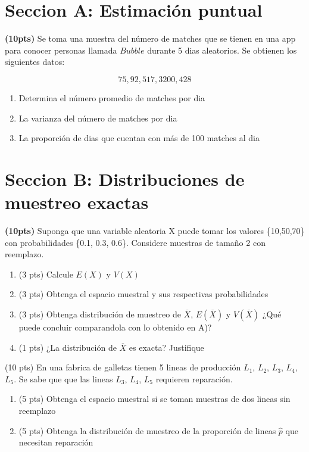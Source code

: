 \documentclass[addpoints]{exam}
\theoremstyle{mytheor}
\begin{document}
\begin{questions} 

\section*{Seccion A: Estimación puntual}

\question \textbf{(10pts)} Se toma una muestra del número de matches que se tienen en una app para conocer personas llamada $Bubble$ durante 5 dias aleatorios. Se obtienen los siguientes datos:

$$75, 92, 517, 3200, 428$$

\begin{enumerate}[label=\Alph*)]
\item Determina el número promedio de matches por dia
\item La varianza del número de matches por dia
\item La proporción de dias que cuentan con más de 100 matches al dia
\end{enumerate}

\section*{Seccion B: Distribuciones de muestreo exactas}

\question \textbf{(10pts)} Suponga que una variable aleatoria X puede tomar los valores \{10,50,70\} con probabilidades \{0.1, 0.3, 0.6\}. Considere muestras de tamaño 2 con reemplazo.
  
  \begin{enumerate}
  \item (3 pts) Calcule $E(X)$ y $V(X)$
  \item (3 pts) Obtenga el espacio muestral y sus respectivas probabilidades
  \item (3 pts) Obtenga distribución de muestreo de $\overline{X}$, $E(\overline{X})$ y $V(\overline{X})$ ¿Qué puede concluir comparandola con lo obtenido en A)?
  \item (1 pts) ¿La distribución de $\overline{X}$ es exacta? Justifique
  \end{enumerate}

 \question (10 pts) En una fabrica de galletas tienen 5 lineas de producción $L_1$, $L_2$, $L_3$, $L_4$, $L_5$. Se sabe que que las lineas $L_3$, $L_4$, $L_5$ requieren reparación.

  \begin{enumerate}
  \item (5 pts) Obtenga el espacio muestral si se toman muestras de dos lineas sin reemplazo
  \item (5 pts) Obtenga la distribución de muestreo de la proporción de lineas $\hat{p}$ que necesitan reparación
  \end{enumerate}


\end{questions}
\end{document}
